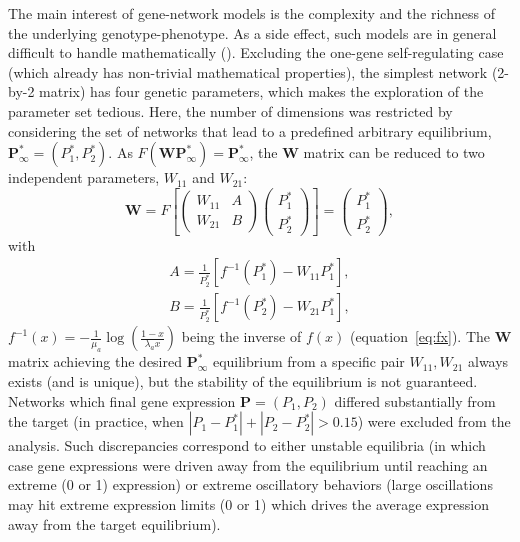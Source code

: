 \documentclass[a4paper]{article}
\begin{document}
The main interest of gene-network models is the complexity and the richness of the underlying genotype-phenotype. As a side effect, such models are in general difficult to handle mathematically (\cite{CTH11,LP12}). Excluding the one-gene self-regulating case (which already has non-trivial mathematical properties), the simplest network (2-by-2 matrix) has four genetic parameters, which makes the exploration of the parameter set tedious. Here, the number of dimensions was restricted by considering the set of networks that lead to a predefined arbitrary equilibrium, $\bm P^\ast_\infty = (P^\ast_1, P^\ast_2)$. As $F(\bm W \bm P^\ast_\infty) = \bm P^\ast_\infty$, the $\bm W$ matrix can be reduced to two independent parameters, $W_{11}$ and $W_{21}$:
\begin{equation}
    \bm W = F \left [\begin{pmatrix} W_{11} & A \\ W_{21} & B \end{pmatrix}  \begin{pmatrix} P^\ast_1 \\ P^\ast_2 \end{pmatrix} \right] = \begin{pmatrix}P^\ast_1 \\ P^\ast_2 \end{pmatrix},
\end{equation}
\noindent with
\begin{equation}
	\label{eq:predef}
    \begin{split}
        A = \frac{1}{P^\ast_2} [f^{-1}(P^\ast_1)-W_{11}P^\ast_1], \\
        B = \frac{1}{P^\ast_2} [f^{-1}(P^\ast_2) - W_{21} P^\ast_1],
    \end{split}
\end{equation}
\noindent $f^{-1}(x) = -\frac{1}{\mu_a} \log \left( \frac{1-x}{\lambda_a x} \right)$ being the inverse of $f(x)$ (equation~\ref{eq:fx}). The $\bm W$ matrix achieving the desired $\bm P^\ast_\infty$ equilibrium from a specific pair $W_{11}, W_{21}$ always exists (and is unique), but the stability of the equilibrium is not guaranteed. Networks which final gene expression $\bm P = (P_1,P_2)$ differed substantially from the target (in practice, when $|P_1 - P^\ast_1| + |P_2 - P^\ast_2| > 0.15$) were excluded from the analysis. Such discrepancies correspond to either unstable equilibria (in which case gene expressions were driven away from the equilibrium until reaching an extreme (0 or 1) expression) or extreme oscillatory behaviors (large oscillations may hit extreme expression limits (0 or 1) which drives the average expression away from the target equilibrium). 
\end{document}
